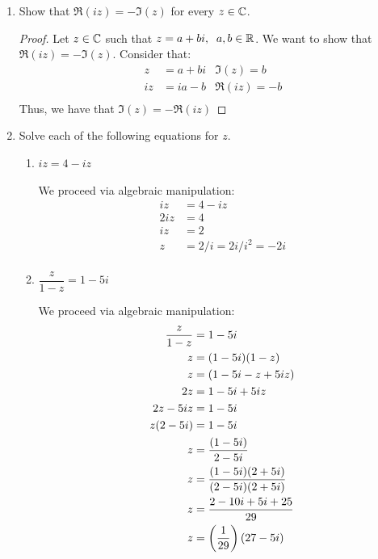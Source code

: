 \begin{enumerate}
	\item Show that $\Re(iz) = -\Im(z)$ for every $z\in \mathbb{C}$.
    
    \begin{proof}
        Let $z\in \mathbb{C}$ such that $z = a + bi, \;\;a,b\in\mathbb{R}$. We want to show that $\Re(iz) = -\Im(z)$. \gline{}
        Consider that:
        \begin{align*}
            z &= a + bi&\Im(z) = b\\
            iz &= ia - b&\Re(iz) = -b\\
        \end{align*}
        Thus, we have that $\Im(z) = -\Re(iz)$
    \end{proof}



	\item Solve each of the following equations for $z$.
    \begin{enumerate}

        \item $iz = 4-iz$
        
        \begin{problem}
            We proceed via algebraic manipulation:
            \begin{align*}
                iz &= 4 - iz\\
                2iz &= 4\\
                iz &= 2\\
                z &= 2/i = 2i/i^2 = \boxed{-2i}\\
            \end{align*}
        \end{problem}
        



        \item $\dfrac{z}{1-z} = 1-5i$
        
        \begin{problem}
            We proceed via algebraic manipulation:
            \begin{align*}
                \frac{z}{1-z}&= 1 - 5i\\
                z &= (1-5i)(1-z)\\
                z&= (1 -5i - z + 5iz)\\
                2z &= 1 - 5i + 5iz\\
                2z - 5iz &= 1 - 5i\\
                z(2 - 5i) &= 1 - 5i\\
                z &= \frac{(1-5i)}{2 - 5i}\\
                z&= \frac{(1-5i)(2+5i)}{(2-5i)(2+5i)}\\
                z&= \frac{2-10i+5i+25}{29}\\
                z&= \left(\frac{1}{29}\right)(27 - 5i)
            \end{align*}
        \end{problem}
        





\end{enumerate}
\end{enumerate}
